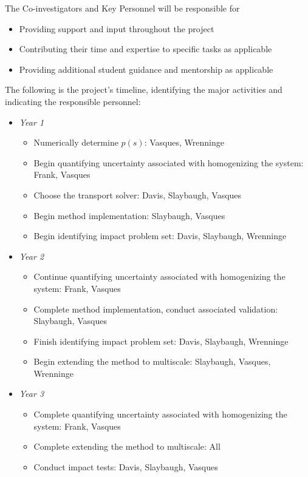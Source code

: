 \documentclass[12pt]{article}
\begin{document}
The Co-investigators and Key Personnel will be responsible for
\begin{itemize}[noitemsep]
\item Providing support and input throughout the project
\item Contributing their time and expertise to specific tasks as applicable
\item Providing additional student guidance and mentorship as applicable
\end{itemize}

The following is the project's timeline, identifying the major activities and indicating the responsible personnel:
\begin{itemize}
\item \textit{Year 1}
\begin{itemize}[noitemsep]
\item Numerically determine $p(s)$: Vasques, Wrenninge
\item Begin quantifying uncertainty associated with homogenizing the system: Frank, Vasques
\item Choose the transport solver: Davis, Slaybaugh, Vasques
\item Begin method implementation: Slaybaugh, Vasques
\item Begin identifying impact problem set: Davis, Slaybaugh, Wrenninge
\end{itemize}
\item \textit{Year 2}
\begin{itemize}[noitemsep]
\item Continue quantifying uncertainty associated with homogenizing the system: Frank, Vasques
\item Complete method implementation, conduct associated validation: Slaybaugh, Vasques
\item Finish identifying impact problem set: Davis, Slaybaugh, Wrenninge
\item Begin extending the method to multiscale: Slaybaugh, Vasques, Wrenninge
\end{itemize}
\item \textit{Year 3}
\begin{itemize}[noitemsep]
\item Complete quantifying uncertainty associated with homogenizing the system: Frank, Vasques
\item Complete extending the method to multiscale: All
\item Conduct impact tests: Davis, Slaybaugh, Vasques
\end{itemize}
\end{itemize}
\end{document}
